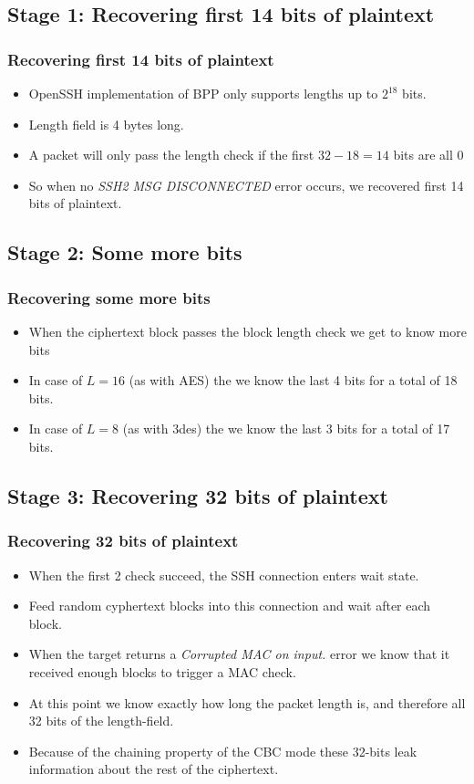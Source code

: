 \documentclass[fleqn]{beamer}
\begin{document}
\subsection{Stage 1: Recovering first 14 bits of plaintext}
  
   \begin{frame}
    \frametitle{Recovering first 14 bits of plaintext}
        \begin{itemize}
      \item OpenSSH implementation of BPP only supports lengths up to $2^{18}$ bits.
      \item Length field is 4 bytes long.
      \item A packet will only pass the length check if the first $32-18=14$ bits are all 0
      \item So when no \textit{SSH2 MSG DISCONNECTED} error occurs, we recovered first 14 bits of plaintext.
    \end{itemize}
   \end{frame}
 
 \subsection{Stage 2: Some more bits}
  
   \begin{frame}
    \frametitle{Recovering some more bits}
        \begin{itemize}
      \item When the ciphertext block passes the block length check we get to know more bits
      \item In case of $L = 16$ (as with AES) the we know the last 4 bits for a total of 18 bits.
      \item In case of $L = 8$ (as with 3des) the we know the last 3 bits for a total of 17 bits.
    \end{itemize}   
  \end{frame}

 \subsection{Stage 3: Recovering 32 bits of plaintext}
  
   \begin{frame}
    \frametitle{Recovering 32 bits of plaintext}
        \begin{itemize}
      \item When the first 2 check succeed, the SSH connection enters wait state.
      \item Feed random cyphertext blocks into this connection and wait after each block.
      \item When the target returns a \textit{Corrupted MAC on input.} error we know that it received enough blocks to trigger a MAC check.
      \item At this point we know exactly how long the packet length is, and therefore all 32 bits of the length-field. 
      \item Because of the chaining property of the CBC mode these 32-bits leak information about the rest of the ciphertext.
    \end{itemize}   
  \end{frame}	  
\end{document}
